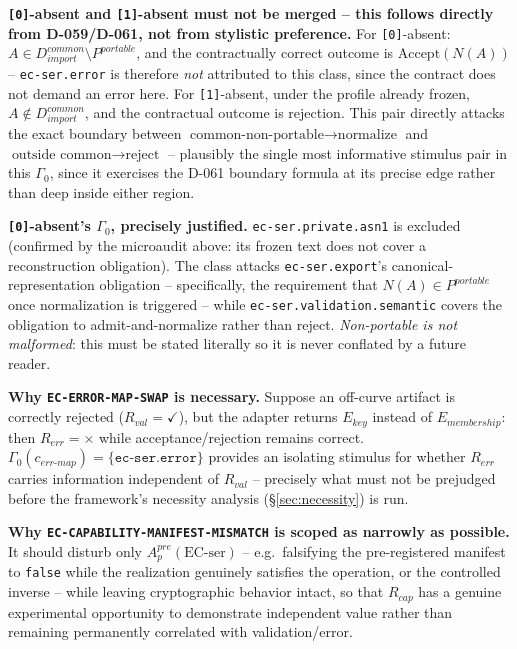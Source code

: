 \documentclass[11pt,a4paper]{article}
\begin{document}
\textbf{\texttt{[0]}-absent and \texttt{[1]}-absent must not be merged -- this follows directly from D-059/D-061, not from stylistic preference.} For \texttt{[0]}-absent: $A\in D_{import}^{common}\setminus P^{portable}$, and the contractually correct outcome is $\text{Accept}(N(A))$ -- \texttt{ec-ser.error} is therefore \emph{not} attributed to this class, since the contract does not demand an error here. For \texttt{[1]}-absent, under the profile already frozen, $A\notin D_{import}^{common}$, and the contractual outcome is rejection. This pair directly attacks the exact boundary between $\text{common-non-portable}\to\text{normalize}$ and $\text{outside common}\to\text{reject}$ -- plausibly the single most informative stimulus pair in this $\Gamma_0$, since it exercises the D-061 boundary formula at its precise edge rather than deep inside either region.

\textbf{\texttt{[0]}-absent's $\Gamma_0$, precisely justified.} \texttt{ec-ser.private.asn1} is excluded (confirmed by the microaudit above: its frozen text does not cover a reconstruction obligation). The class attacks \texttt{ec-ser.export}'s canonical-representation obligation -- specifically, the requirement that $N(A)\in P^{portable}$ once normalization is triggered -- while \texttt{ec-ser.validation.semantic} covers the obligation to admit-and-normalize rather than reject. \emph{Non-portable is not malformed}: this must be stated literally so it is never conflated by a future reader.

\textbf{Why \texttt{EC-ERROR-MAP-SWAP} is necessary.} Suppose an off-curve artifact is correctly rejected ($R_{val}=\checkmark$), but the adapter returns $E_{key}$ instead of $E_{membership}$: then $R_{err}=\times$ while acceptance/rejection remains correct. $\Gamma_0(c_{err\text{-}map})=\{\texttt{ec-ser.error}\}$ provides an isolating stimulus for whether $R_{err}$ carries information independent of $R_{val}$ -- precisely what must not be prejudged before the framework's necessity analysis (\S\ref{sec:necessity}) is run.

\textbf{Why \texttt{EC-CAPABILITY-MANIFEST-MISMATCH} is scoped as narrowly as possible.} It should disturb only $A_p^{pre}(\text{EC-ser})$ -- e.g.\ falsifying the pre-registered manifest to \texttt{false} while the realization genuinely satisfies the operation, or the controlled inverse -- while leaving cryptographic behavior intact, so that $R_{cap}$ has a genuine experimental opportunity to demonstrate independent value rather than remaining permanently correlated with validation/error.
\end{document}
